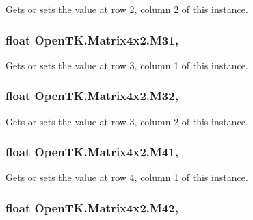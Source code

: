 Gets or sets the value at row 2, column 2 of this instance. 

\hypertarget{struct_open_t_k_1_1_matrix4x2_a21a388c8e851b2f23f7cac29a04b2b96}{
\subsubsection[{M31}]{\setlength{\rightskip}{0pt plus 5cm}float Open\-T\-K.\-Matrix4x2.\-M31\hspace{0.3cm}{\ttfamily [get]}, {\ttfamily [set]}}}\label{struct_open_t_k_1_1_matrix4x2_a21a388c8e851b2f23f7cac29a04b2b96}


Gets or sets the value at row 3, column 1 of this instance. 

\hypertarget{struct_open_t_k_1_1_matrix4x2_a473679a8455c2bb19f9a94f50009f1c3}{
\subsubsection[{M32}]{\setlength{\rightskip}{0pt plus 5cm}float Open\-T\-K.\-Matrix4x2.\-M32\hspace{0.3cm}{\ttfamily [get]}, {\ttfamily [set]}}}\label{struct_open_t_k_1_1_matrix4x2_a473679a8455c2bb19f9a94f50009f1c3}


Gets or sets the value at row 3, column 2 of this instance. 

\hypertarget{struct_open_t_k_1_1_matrix4x2_aeb4705636436f1714caf90227877da03}{
\subsubsection[{M41}]{\setlength{\rightskip}{0pt plus 5cm}float Open\-T\-K.\-Matrix4x2.\-M41\hspace{0.3cm}{\ttfamily [get]}, {\ttfamily [set]}}}\label{struct_open_t_k_1_1_matrix4x2_aeb4705636436f1714caf90227877da03}


Gets or sets the value at row 4, column 1 of this instance. 

\hypertarget{struct_open_t_k_1_1_matrix4x2_a5d4d59dc36920b16dfcab6b6f520984d}{
\subsubsection[{M42}]{\setlength{\rightskip}{0pt plus 5cm}float Open\-T\-K.\-Matrix4x2.\-M42\hspace{0.3cm}{\ttfamily [get]}, {\ttfamily [set]}}}\label{struct_open_t_k_1_1_matrix4x2_a5d4d59dc36920b16dfcab6b6f520984d}


